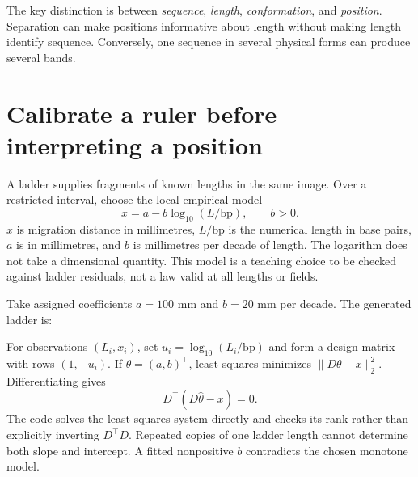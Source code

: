 The key distinction is between \emph{sequence}, \emph{length}, \emph{conformation}, and \emph{position}. Separation can make positions informative about length without making length identify sequence. Conversely, one sequence in several physical forms can produce several bands.

\section{Calibrate a ruler before interpreting a position}
A ladder supplies fragments of known lengths in the same image. Over a restricted interval, choose the local empirical model
\begin{equation}
x=a-b\log_{10}(L/\mathrm{bp}),\qquad b>0. \label{eq:ladder}
\end{equation}
$x$ is migration distance in millimetres, $L/\mathrm{bp}$ is the numerical length in base pairs, $a$ is in millimetres, and $b$ is millimetres per decade of length. The logarithm does not take a dimensional quantity. This model is a teaching choice to be checked against ladder residuals, not a law valid at all lengths or fields.

Take assigned coefficients $a=100$ mm and $b=20$ mm per decade. The generated ladder is:
\begin{center}\end{center}


For observations $(L_i,x_i)$, set $u_i=\log_{10}(L_i/\mathrm{bp})$ and form a design matrix with rows $(1,-u_i)$. If $\theta=(a,b)^\top$, least squares minimizes $\|D\theta-x\|_2^2$. Differentiating gives
\begin{equation}
D^\top(D\widehat\theta-x)=0.
\end{equation}
The code solves the least-squares system directly and checks its rank rather than explicitly inverting $D^\top D$. Repeated copies of one ladder length cannot determine both slope and intercept. A fitted nonpositive $b$ contradicts the chosen monotone model.

